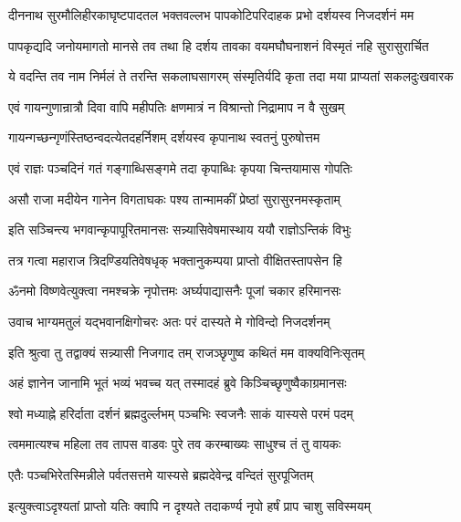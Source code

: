 \twolineshloka
{दीननाथ सुरमौलिहीरकाघृष्टपादतल भक्तवल्लभ}
{पापकोटिपरिदाहक प्रभो दर्शयस्व निजदर्शनं मम}%

\twolineshloka
{पापकृद्यदि जनोयमागतो मानसे तव तथा हि दर्शय}
{तावका वयमघौघनाशनं विस्मृतं नहि सुरासुरार्चित}%

\twolineshloka
{ये वदन्ति तव नाम निर्मलं ते तरन्ति सकलाघसागरम्}
{संस्मृतिर्यदि कृता तदा मया प्राप्यतां सकलदुःखवारक}%


\twolineshloka
{एवं गायन्गुणान्रात्रौ दिवा वापि महीपतिः}
{क्षणमात्रं न विश्रान्तो निद्रामाप न वै सुखम्}%

\twolineshloka
{गायन्गच्छन्गृणंस्तिष्ठन्वदत्येतदहर्निशम्}
{दर्शयस्व कृपानाथ स्वतनुं पुरुषोत्तम}%

\twolineshloka
{एवं राज्ञः पञ्चदिनं गतं गङ्गाब्धिसङ्गमे}
{तदा कृपाब्धिः कृपया चिन्तयामास गोपतिः}%

\twolineshloka
{असौ राजा मदीयेन गानेन विगताघकः}
{पश्य तान्मामकीं प्रेष्ठां सुरासुरनमस्कृताम्}%

\twolineshloka
{इति सञ्चिन्त्य भगवान्कृपापूरितमानसः}
{सन्न्यासिवेषमास्थाय ययौ राज्ञोऽन्तिकं विभुः}%

\twolineshloka
{तत्र गत्वा महाराज त्रिदण्डियतिवेषधृक्}
{भक्तानुकम्पया प्राप्तो वीक्षितस्तापसेन हि}%

\twolineshloka
{ॐनमो विष्णवेत्युक्त्वा नमश्चक्रे नृपोत्तमः}
{अर्घ्यपाद्यासनैः पूजां चकार हरिमानसः}%

\twolineshloka
{उवाच भाग्यमतुलं यद्भवानक्षिगोचरः}
{अतः परं दास्यते मे गोविन्दो निजदर्शनम्}%

\twolineshloka
{इति श्रुत्वा तु तद्वाक्यं सन्न्यासी निजगाद तम्}
{राजञ्छृणुष्व कथितं मम वाक्यविनिःसृतम्}%

\twolineshloka
{अहं ज्ञानेन जानामि भूतं भव्यं भवच्च यत्}
{तस्मादहं ब्रुवे किञ्चिच्छृणुष्वैकाग्रमानसः}%

\twolineshloka
{श्वो मध्याह्ने हरिर्दाता दर्शनं ब्रह्मदुर्ल्लभम्}
{पञ्चभिः स्वजनैः साकं यास्यसे परमं पदम्}%

\twolineshloka
{त्वममात्यश्च महिला तव तापस वाडवः}
{पुरे तव करम्बाख्यः साधुश्च तं तु वायकः}%

\twolineshloka
{एतैः पञ्चभिरेतस्मिन्नीले पर्वतसत्तमे}
{यास्यसे ब्रह्मदेवेन्द्र वन्दितं सुरपूजितम्}%

\twolineshloka
{इत्युक्त्वाऽदृश्यतां प्राप्तो यतिः क्वापि न दृश्यते}
{तदाकर्ण्य नृपो हर्षं प्राप चाशु सविस्मयम्}%


